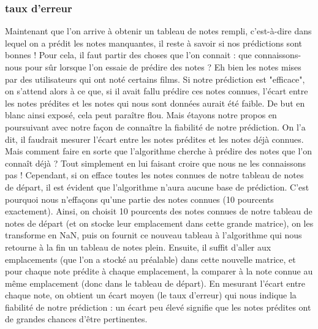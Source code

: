 \documentclass[a4paper,10pt]{article}
\begin{document}
\subsubsection{taux d'erreur}
Maintenant que l'on arrive à obtenir un tableau de notes rempli, c'est-à-dire dans lequel on a prédit les notes manquantes, il reste à savoir si nos prédictions sont bonnes ! 
Pour cela, il faut partir des choses que l'on connait : que connaissons-nous pour sûr lorsque l'on essaie de prédire des notes ? 
Eh bien les notes mises par des utilisateurs qui ont noté certains films. 
Si notre prédiction est "efficace", on s'attend alors à ce que, si il avait fallu prédire ces notes connues, 
l'écart entre les notes prédites et les notes qui nous sont données aurait été faible. De but en blanc ainsi exposé, cela peut paraître flou. 
Mais étayons notre propos en poursuivant avec notre façon de connaître la fiabilité de notre prédiction. 
On l'a dit, il faudrait mesurer l'écart entre les notes prédites et les notes déjà connues. 
Mais comment faire en sorte que l'algorithme cherche à prédire des notes que l'on connaît déjà ? 
Tout simplement en lui faisant croire que nous ne les connaissons pas ! 
Cependant, si on efface toutes les notes connues de notre tableau de notes de départ, il est évident que l'algorithme n'aura aucune base de prédiction. 
C'est pourquoi nous n'effaçons qu'une partie des notes connues (10 pourcents exactement). 
Ainsi, on choisit 10 pourcents des notes connues de notre tableau de notes de départ (et on stocke leur emplacement dans cette grande matrice), 
on les transforme en NaN, puis on fournit ce nouveau tableau à l'algorithme qui nous retourne à la fin un tableau de notes plein. 
Ensuite, il suffit d'aller aux emplacements (que l'on a stocké au préalable) dans cette nouvelle matrice, et pour chaque note prédite à chaque emplacement, 
la comparer à la note connue au même emplacement (donc dans le tableau de départ). 
En mesurant l'écart entre chaque note, on obtient un écart moyen (le taux d'erreur) qui nous indique la fiabilité de notre prédiction : 
un écart peu élevé signifie que les notes prédites ont de grandes chances d'être pertinentes. 
\end{document}
